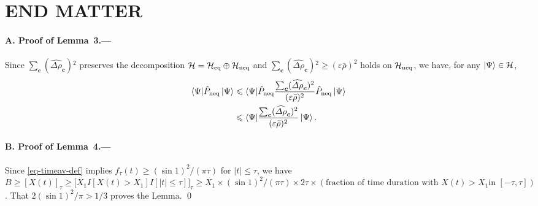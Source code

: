 \documentclass[aps,prl,superscriptaddress,reprint]{revtex4-2}
\newcommand{\se}[1]{\paragraph{#1.---}}
\theoremstyle{definition}
\newcommand{\paren}[1]{{\left( #1 \right)}}
\newcommand{\brak}[1]{{\left[ #1 \right]}}
\newcommand{\bigbrak}[1]{\bigl[{#1}\bigr]}
\newcommand{\nn}{\notag \\ }
\newcommand{\di}{\displaystyle}
\newcommand{\ma}[1]{{$\di #1$}}
\newcommand{\HH}{{\cal H}}
\newcommand{\ba}[1]{\bar{#1}}
\newcommand{\ket}[1]{\left|{#1}\right\rangle}
\newcommand{\bra}[1]{\langle{#1}|}
\newcommand{\sw}[2]{\bra{#1}{#2}\ket{#1}}
\newcommand{\wh}{\widehat}
\newcommand{\ta}{\tau}
\newcommand{\De}{\varDelta}
\newcommand{\ep}{\varepsilon}
\renewcommand{\r}{\rho}
\newcommand{\f}{\frac}
\newcommand{\ve}[1]{\boldsymbol{#1}}
\renewcommand{\ge}{\geqslant}
\renewcommand{\le}{\leqslant}
\renewcommand{\leq}{\leqslant}
\newcommand{\tx}{\text}
\newcommand{\eqb}{_{\text{eq}}}
\newcommand{\neqb}{_\mathrm{neq}}
\newcommand{\nqb}{\neqb}
\begin{document}


\appendix

\newpage


\newpage

\section*{END MATTER}




\se{A. Proof of Lemma~3}
Since $\sum_{\ve c}(\wh{\De\r}_{\ve c}){}^2$
preserves the decomposition
$\HH=\HH\eqb\oplus\HH\nqb$ and
$\sum_{\ve c}(\wh{\De\r}_{\ve c}){}^2\ge(\ep\ba\r)^2$
holds
on
$\HH\nqb$, we have, for any $\ket\Psi\in\HH$,
\begin{align}
  \sw\Psi {\hat{P}\nqb}
  &\le
  \bra\Psi {\hat{P}\nqb}
  \f{\sum_{\ve c}(\wh{\De\r}_{\ve c}){}^2}{(\ep\ba\r)^2}
    {\hat{P}\nqb}\ket\Psi
    \nn
    &
    \le
      \bra\Psi \f{\sum_{\ve c}
      (\wh{\De\r}_{\ve c}){}^2}
      {(\ep\ba\r)^2}\ket\Psi.
\end{align}


\se{B. Proof of Lemma~4}
Since \eqref{eq-timeav-def} implies
$f_\ta(t)\ge (\sin1)^2/(\pi\ta)$ for $|t|\leq \tau$,
we have
$
B\ge \brak{X(t)}_\ta
  \ge
  \bigbrak{X_1 I[X(t)>X_1]I[|t|\le \ta] }_\ta
  \ge
  X_1 \times
  (\sin1)^2/(\pi\ta) \times 2\ta \times
  \paren{\tx{fraction of time duration with \ma{X(t)>X_1}
      in \ma{[-\ta,\ta]}}}
$.
That $2 (\sin 1)^2/\pi >1/3$
proves the Lemma.
\qed

\medskip
\end{document}
